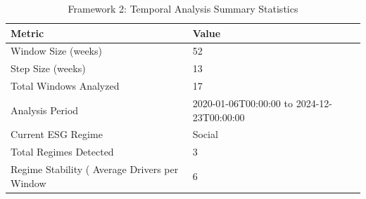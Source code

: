\begin{table}
\caption{Framework 2: Temporal Analysis Summary Statistics}
\label{tab:temporal_summary}
\begin{tabular}{ll}
\toprule
Metric & Value \\
\midrule
Window Size (weeks) & 52 \\
Step Size (weeks) & 13 \\
Total Windows Analyzed & 17 \\
Analysis Period & 2020-01-06T00:00:00 to 2024-12-23T00:00:00 \\
Current ESG Regime & Social \\
Total Regimes Detected & 3 \\
Regime Stability (%
Average Drivers per Window & 6 \\
\bottomrule
\end{tabular}
\end{table}
